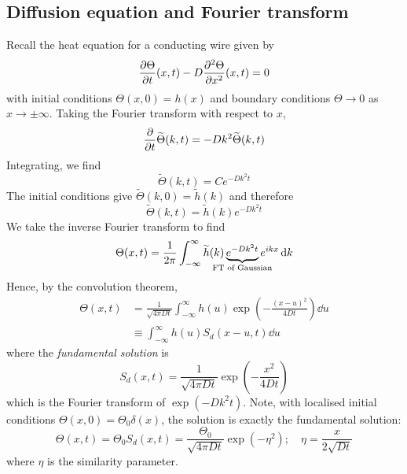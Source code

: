 \subsection{Diffusion equation and Fourier transform}
Recall the heat equation for a conducting wire given by
\[
	\pdv{\Theta}{t}\qty(x,t) - D\pdv[2]{\Theta}{x}\qty(x,t) = 0
\]
with initial conditions \( \Theta(x,0) = h(x) \) and boundary conditions \( \Theta \to 0 \) as \( x \to \pm \infty \).
Taking the Fourier transform with respect to \( x \),
\[
	\pdv{t} \widetilde \Theta(k,t) = -D k^2 \widetilde \Theta(k,t)
\]
Integrating, we find
\[
	\widetilde \Theta(k,t) = C e^{-D k^2 t}
\]
The initial conditions give \( \widetilde \Theta(k,0) = \widetilde h(k) \) and therefore
\[
	\widetilde \Theta(k,t) = \widetilde h(k) e^{-Dk^2 t}
\]
We take the inverse Fourier transform to find
\[
	\Theta(x,t) = \frac{1}{2\pi} \int_{-\infty}^\infty \widetilde h(k) \underbrace{e^{-Dk^2 t}}_{\mathclap{\text{FT of Gaussian}}} e^{ikx} \dd{k}
\]
Hence, by the convolution theorem,
\begin{align*}
	\Theta(x,t) & = \frac{1}{\sqrt{4 \pi D t}} \int_{-\infty}^\infty h(u) \exp(-\frac{(x-u)^2}{4Dt}) \dd{u} \\
	            & \equiv \int_{-\infty}^\infty h(u) S_d(x-u,t) \dd{u}
\end{align*}
where the \textit{fundamental solution} is
\[
	S_d(x,t) = \frac{1}{\sqrt{4 \pi D t}} \exp(-\frac{x^2}{4Dt})
\]
which is the Fourier transform of \( \exp(-D k^2 t) \).
Note, with localised initial conditions \( \Theta(x,0) = \Theta_0 \delta(x) \), the solution is exactly the fundamental solution:
\[
	\Theta(x,t) = \Theta_0 S_d(x,t) = \frac{\Theta_0}{\sqrt{4 \pi D t}} \exp(-\eta^2);\quad \eta = \frac{x}{2\sqrt{Dt}}
\]
where \( \eta \) is the similarity parameter.

